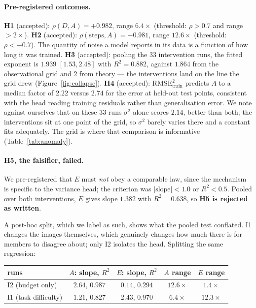 \documentclass[10pt]{article}
\begin{document}
\paragraph{Pre-registered outcomes.}
\textbf{H1} (accepted): $\rho(D, A) = +0.982$, range $6.4\times$ (threshold: $\rho>0.7$ and
range $>2\times$).
\textbf{H2} (accepted): $\rho(\text{steps}, A) = -0.981$, range $12.6\times$ (threshold:
$\rho<-0.7$). The quantity of noise a model reports in its data is a function of how long it
was trained.
\textbf{H3} (accepted): pooling the 33 intervention runs, the fitted exponent is $1.939$
$[1.53, 2.48]$ with $R^2 = 0.882$, against $1.864$ from the observational grid and $2$ from
theory --- the interventions land on the line the grid drew (Figure~\ref{fig:collapse}).
\textbf{H4} (accepted): $\mathrm{RMSE}_{\mathrm{train}}^2$ predicts $A$ to a median factor of
$2.22$ versus $2.74$ for the error at held-out test points, consistent with the head reading
training residuals rather than generalisation error. We note against ourselves that on these
33 runs $\sigma^2$ alone scores $2.14$, better than both; the interventions sit at one point
of the grid, so $\sigma^2$ barely varies there and a constant fits adequately. The grid is
where that comparison is informative (Table~\ref{tab:anomaly}).

\paragraph{H5, the falsifier, failed.} We pre-registered that $E$ must \emph{not} obey a
comparable law, since the mechanism is specific to the variance head; the criterion was
$|\text{slope}|<1.0$ or $R^2<0.5$. Pooled over both interventions, $E$ gives slope $1.382$
with $R^2=0.638$, so \textbf{H5 is rejected as written}.

A post-hoc split, which we label as such, shows what the pooled test conflated. I1 changes
the images themselves, which genuinely changes how much there is for members to disagree
about; only I2 isolates the head. Splitting the same regression:

\begin{center}
\small
\begin{tabular}{lcccc}
\toprule
runs & $A$: slope, $R^2$ & $E$: slope, $R^2$ & $A$ range & $E$ range \\
\midrule
I2 (budget only)     & $2.64$, $0.987$ & $0.14$, $0.294$ & $\mathbf{12.6\times}$ & $\mathbf{1.4\times}$ \\
I1 (task difficulty) & $1.21$, $0.827$ & $2.43$, $0.970$ & $6.4\times$ & $12.3\times$ \\
\bottomrule
\end{tabular}
\end{center}
\end{document}
